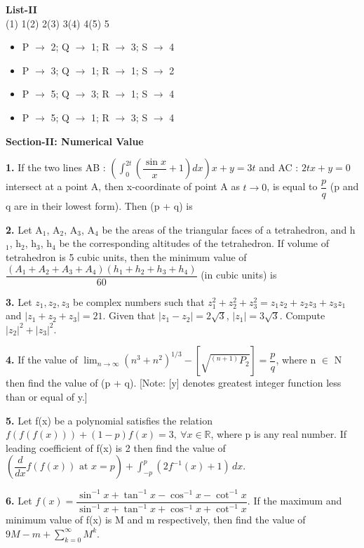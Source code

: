 \documentclass[10pt,twocolumn]{extarticle}
\newenvironment{qoptions}{\begin{itemize}[leftmargin=1.8em,itemsep=2pt,topsep=2pt,label={}]}{\end{itemize}}
\newcommand{\opt}[2]{\item[({#1})] {#2}}
\newcommand{\subsectionhdr}[1]{\par\vspace{3pt}\noindent\textbf{#1}\par\vspace{2pt}}
\begin{document}
\textbf{List-II}\\
(1) 1\quad (2) 2\quad (3) 3\quad (4) 4\quad (5) 5

\begin{qoptions}
\opt{A}{P $\to$ 2; Q $\to$ 1; R $\to$ 3; S $\to$ 4}
\opt{B}{P $\to$ 3; Q $\to$ 1; R $\to$ 1; S $\to$ 2}
\opt{C}{P $\to$ 5; Q $\to$ 3; R $\to$ 1; S $\to$ 4}
\opt{D}{P $\to$ 5; Q $\to$ 1; R $\to$ 3; S $\to$ 4}
\end{qoptions}

\subsectionhdr{Section-II: Numerical Value}

\textbf{1.} If the two lines AB : $\left(\displaystyle\int_0^{2t}\left(\dfrac{\sin x}{x}+1\right)dx\right)x+y=3t$ and AC : $2tx+y=0$ intersect at a point A, then x-coordinate of point A as $t\to0$, is equal to $\dfrac pq$ (p and q are in their lowest form). Then (p + q) is

\textbf{2.} Let A$_1$, A$_2$, A$_3$, A$_4$ be the areas of the triangular faces of a tetrahedron, and h$_1$, h$_2$, h$_3$, h$_4$ be the corresponding altitudes of the tetrahedron. If volume of tetrahedron is 5 cubic units, then the minimum value of $\dfrac{(A_1+A_2+A_3+A_4)(h_1+h_2+h_3+h_4)}{60}$ (in cubic units) is

\textbf{3.} Let $z_1,z_2,z_3$ be complex numbers such that $z_1^2+z_2^2+z_3^2=z_1z_2+z_2z_3+z_3z_1$ and $|z_1+z_2+z_3|=21$. Given that $|z_1-z_2|=2\sqrt3$, $|z_1|=3\sqrt3$. Compute $|z_2|^2+|z_3|^2$.

\textbf{4.} If the value of $\displaystyle\lim_{n\to\infty}(n^3+n^2)^{1/3}-\left[\sqrt{{}^{(n+1)}P_2}\right]=\dfrac pq$, where n $\in$ N then find the value of (p + q).
[Note: [y] denotes greatest integer function less than or equal of y.]

\textbf{5.} Let f(x) be a polynomial satisfies the relation $f(f(f(x)))+(1-p)f(x)=3,\ \forall x\in\mathbb R$, where p is any real number. If leading coefficient of f(x) is 2 then find the value of $\left(\dfrac{d}{dx}f(f(x))\text{ at }x=p\right)+\displaystyle\int_{-p}^p(2f^{-1}(x)+1)\,dx$.

\textbf{6.} Let $f(x)=\dfrac{\sin^{-1}x+\tan^{-1}x-\cos^{-1}x-\cot^{-1}x}{\sin^{-1}x+\tan^{-1}x+\cos^{-1}x+\cot^{-1}x}$. If the maximum and minimum value of f(x) is M and m respectively, then find the value of $9M-m+\displaystyle\sum_{k=0}^\infty M^k$.
\end{document}
